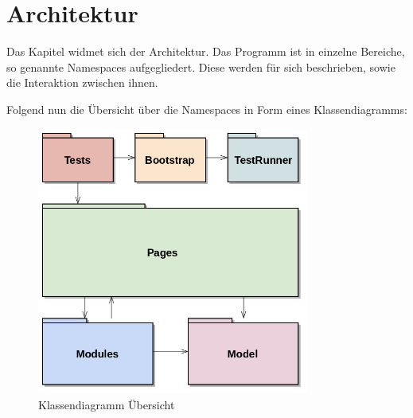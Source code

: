 \section{Architektur}
\label{sec:umsetzung:architektur}
Das Kapitel widmet sich der Architektur. Das Programm ist in einzelne Bereiche, so genannte Namespaces aufgegliedert. Diese werden für sich beschrieben, sowie die Interaktion zwischen ihnen.

Folgend nun die Übersicht über die Namespaces in Form eines Klassendiagramms:

\begin{figure}[H]
	\centering
	\includegraphics[width=0.8\textwidth]{images/semesterarbeit class diagram - overview.png}
	\caption{Klassendiagramm Übersicht}
	\label{fig:umsetzung:architektur}
\end{figure}

